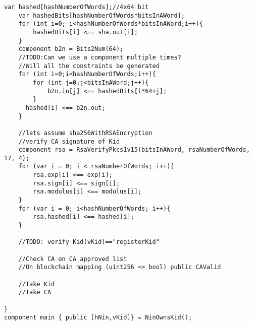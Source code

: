 \documentclass{article}
\begin{document}
\begin{enumerate}[leftmargin=0cm]
\begin{lstlisting}[language=circom]
	var hashed[hashNumberOfWords];//4x64 bit
	var hashedBits[hashNumberOfWords*bitsInAWord];
	for (int i=0; i<hashNumberOfWords*bitsInAWord;i++){
		hashedBits[i] <== sha.out[i];
	}
	component b2n = Bits2Num(64);
	//TODO:Can we use a component multiple times?
	//Will all the constraints be generated
	for (int i=0;i<hashNumberOfWords;i++){
		for (int j=0;j<bitsInAWord;j++){
			b2n.in[j] <== hashedBits[i*64+j];
		}
	  hashed[i] <== b2n.out;
	}

	//lets assume sha256WithRSAEncryption
	//verify CA signature of Kid
	component rsa = RsaVerifyPkcs1v15(bitsInAWord, rsaNumberOfWords, 17, 4);
	for (var i = 0; i < rsaNumberOfWords; i++){
		rsa.exp[i] <== exp[i];
		rsa.sign[i] <== sign[i];
		rsa.modulus[i] <== modulus[i];
	}
	for (var i = 0; i<hashNumberOfWords; i++){
		rsa.hashed[i] <== hashed[i];
	}

	//TODO: verify Kid(vKid)=="registerKid"

	//Check CA on CA approved list
	//On blockchain mapping (uint256 => bool) public CAValid
	
	//Take Kid
	//Take CA
	
}
component main { public [hNin,vKid]} = NinOwnsKid();
\end{lstlisting}
\xdef\tpd{\the\prevdepth}

\end{enumerate}

\newpage
\end{document}
